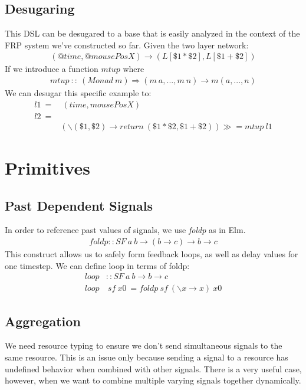 \documentclass[twocolumn,11pt,english]{article}
\begin{document}
\subsection{Desugaring}
This DSL can be desugared to a base that is easily analyzed in the context of the FRP system we've constructed so far. Given the two layer network:
\small
\begin{align*}
(@time, @mousePosX) \rightarrow (L[\$1 * \$2], L[\$1 + \$2])
\end{align*}
\normalsize
If we introduce a function $mtup$ where 
\small
\begin{align*}
mtup~::~(Monad~m) \Rightarrow (m~a, ..., m~n) \rightarrow m (a, ..., n)
\end{align*}
\normalsize
We can desugar this specific example to:
\small
\begin{align*}
l1~=&~(time, mousePosX)
\\l2~=&
\\&(\backslash (\$1, \$2) \rightarrow return~ (\$1 * \$2, \$1 + \$2)) \gg = mtup~l1
\end{align*}
\normalsize

\section{Primitives}
\subsection{Past Dependent Signals}
 In order to reference past values of signals, we use \textit{foldp} as in Elm. 
\begin{align*}
foldp :: SF~a~b \rightarrow (b \rightarrow c) \rightarrow b \rightarrow c
\end{align*}
This construct allows us to safely form feedback loops, as well as delay values for one timestep. We can define loop in terms of foldp:
\begin{align*}
loop& :: SF~a~b \rightarrow b \rightarrow c
\\loop&~sf~x0~= foldp~sf~(\backslash x \rightarrow x)~x0
\end{align*}

\subsection{Aggregation}
 We need resource typing to ensure we don't send simultaneous signals to the same resource. This is an issue only because sending a signal to a resource has undefined behavior when combined with other signals. There is a very useful case, however, when we want to combine multiple varying signals together dynamically.
\end{document}
